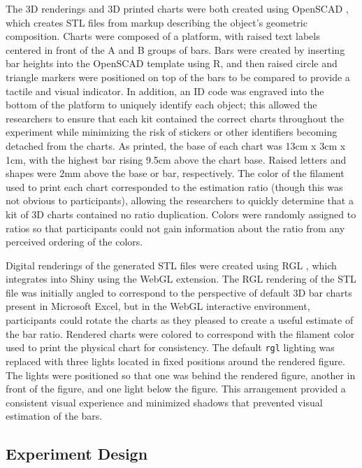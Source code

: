 \documentclass[letterpaper,inpress,dvipsnames]{jdsart}
\begin{document}
The 3D renderings and 3D printed charts were both created using OpenSCAD \citep{kintelOpenSCADDocumentation2023}, which creates STL files from markup describing the object's geometric composition.
Charts were composed of a platform, with raised text labels centered in front of the A and B groups of bars. Bars were created by inserting bar heights into the OpenSCAD template using R, and then raised circle and triangle markers were positioned on top of the bars to be compared to provide a tactile and visual indicator.
In addition, an ID code was engraved into the bottom of the platform to uniquely identify each object; this allowed the researchers to ensure that each kit contained the correct charts throughout the experiment while minimizing the risk of stickers or other identifiers becoming detached from the charts.
As printed, the base of each chart was 13cm x 3cm x 1cm, with the highest bar rising 9.5cm above the chart base.
Raised letters and shapes were 2mm above the base or bar, respectively.
The color of the filament used to print each chart corresponded to the estimation ratio (though this was not obvious to participants), allowing the researchers to quickly determine that a kit of 3D charts contained no ratio duplication.
Colors were randomly assigned to ratios so that participants could not gain information about the ratio from any perceived ordering of the colors.

Digital renderings of the generated STL files were created using RGL \citep{rgl}, which integrates into Shiny \citep{shiny} using the WebGL \citep{mozillafoundationWebGL2D3D2023} extension.
The RGL rendering of the STL file was initially angled to correspond to the perspective of default 3D bar charts present in Microsoft Excel, but in the WebGL interactive environment, participants could rotate the charts as they pleased to create a useful estimate of the bar ratio.
Rendered charts were colored to correspond with the filament color used to print the physical chart for consistency.
The default \texttt{rgl} lighting was replaced with three lights located in fixed positions around the rendered figure.
The lights were positioned so that one was behind the rendered figure, another in front of the figure, and one light below the figure.
This arrangement provided a consistent visual experience and minimized shadows that prevented visual estimation of the bars.

\hypertarget{experiment-design}{%
\subsection{Experiment Design}\label{experiment-design}}
\end{document}
